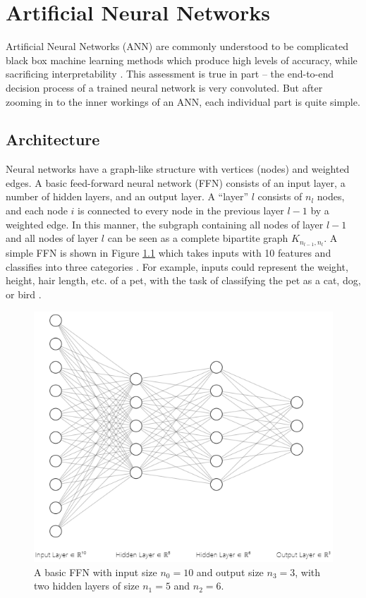 
\appendix \label{apdx}



\chapter{Artificial Neural Networks} \label{apdx:ann}
Artificial Neural Networks (ANN) are commonly understood to be complicated black box machine learning methods which produce high levels of accuracy, while sacrificing interpretability \cite{pattern_rec_book}. This assessment is true in part -- the end-to-end decision process of a trained neural network is very convoluted. But after zooming in to the inner workings of an ANN, each individual part is quite simple.

\section{Architecture}
Neural networks have a graph-like structure with vertices (nodes) and weighted edges. A basic feed-forward neural network (FFN) consists of an input layer, a number of hidden layers, and an output layer. A ``layer'' $l$ consists of $n_l$ nodes, and each node $i$ is connected to every node in the previous layer $l-1$ by a weighted edge. In this manner, the subgraph containing all nodes of layer $l-1$ and all nodes of layer $l$ can be seen as a complete bipartite graph $K_{n_{l-1}, n_l}$. A simple FFN is shown in Figure \ref{fig:ffn_example} which takes inputs with 10 features and classifies into three categories \cite{nn_svg}. For example, inputs could represent the weight, height, hair length, etc. of a pet, with the task of classifying the pet as a cat, dog, or bird \cite{neural_net}.

\begin{figure}[h]
  \centering
  \includegraphics[width=.85\textwidth]{img/ffn_visual.png}
  \caption{A basic FFN with input size $n_0 = 10$ and output size $n_3 = 3$, with two hidden layers of size $n_1 = 5$ and $n_2 = 6$.}
  \label{fig:ffn_example}
\end{figure}

